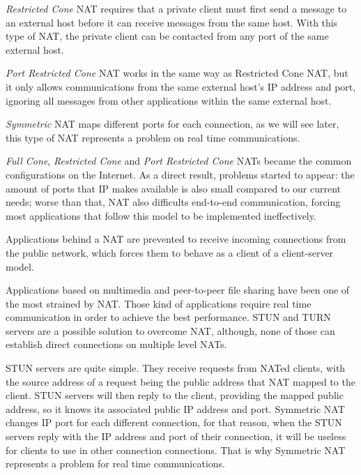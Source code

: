 \emph{Restricted Cone} \ac{NAT} requires that a private client must first send a message to an external host before it can receive messages from the same host. With this type of \ac{NAT}, the private client can be contacted from any port of the same external host.

\emph{Port Restricted Cone} \ac{NAT} works in the same way as Restricted Cone \ac{NAT}, but it only allows communications from the same external host's IP address and port, ignoring all messages from other applications within the same external host.

\emph{Symmetric} NAT maps different ports for each connection, as we will see later, this type of \ac{NAT} represents a problem on real time communications.

\emph{Full Cone}, \emph{Restricted Cone} and \emph{Port Restricted Cone} \ac{NAT}s became the common configurations on the Internet. As a direct result, problems started to appear: the amount of ports that \ac{IP} makes available is also small compared to our current needs; worse than that, \ac{NAT} also difficults end-to-end communication, forcing most applications that follow this model to be implemented ineffectively.

Applications behind a \ac{NAT} are prevented to receive incoming connections from the public network, which forces them to behave as a client of a client-server model. 


Applications based on multimedia and peer-to-peer file sharing have been one of the most strained by \ac{NAT}. Those kind of applications require real time communication in order to achieve the best performance.
\ac{STUN} and \ac{TURN} \cite{natvoip} servers are a possible solution to overcome \ac{NAT}, although, none of those can establish direct connections on multiple level \ac{NAT}s.

\ac{STUN} servers are quite simple. They receive requests from \ac{NAT}ed clients, with the source address of a request being the public address that \ac{NAT} mapped to the client. \ac{STUN} servers will then reply to the client, providing the mapped public address, so it knows its associated public \ac{IP} address and port. Symmetric \ac{NAT} changes \ac{IP} port for each different connection, for that reason, when the \ac{STUN} servers reply with the \ac{IP} address and port of their connection, it will be useless for clients to use in other connection connections. That is why Symmetric \ac{NAT} represents a problem for real time communications.   

